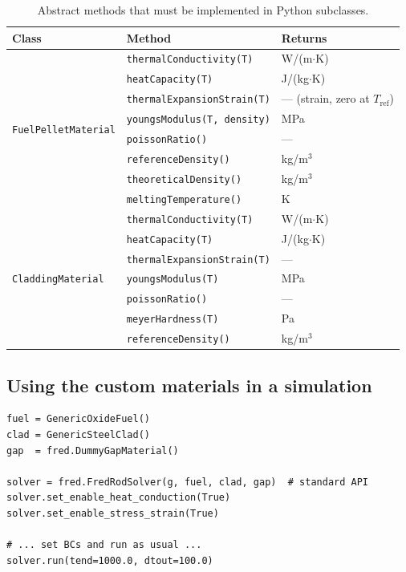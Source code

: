 \documentclass[11pt,a4paper]{article}
\begin{document}
\begin{table}[h]
\centering
\caption{Abstract methods that must be implemented in Python subclasses.}
\label{tab:abstract}
\begin{tabular}{lll}
\toprule
Class & Method & Returns \\
\midrule
\multirow{8}{*}{\texttt{FuelPelletMaterial}}
  & \texttt{thermalConductivity(T)}       & W/(m$\cdot$K) \\
  & \texttt{heatCapacity(T)}              & J/(kg$\cdot$K) \\
  & \texttt{thermalExpansionStrain(T)}    & --- (strain, zero at $T_\text{ref}$) \\
  & \texttt{youngsModulus(T, density)}    & MPa \\
  & \texttt{poissonRatio()}               & --- \\
  & \texttt{referenceDensity()}           & kg/m$^3$ \\
  & \texttt{theoreticalDensity()}         & kg/m$^3$ \\
  & \texttt{meltingTemperature()}         & K \\
\midrule
\multirow{7}{*}{\texttt{CladdingMaterial}}
  & \texttt{thermalConductivity(T)}       & W/(m$\cdot$K) \\
  & \texttt{heatCapacity(T)}             & J/(kg$\cdot$K) \\
  & \texttt{thermalExpansionStrain(T)}   & --- \\
  & \texttt{youngsModulus(T)}            & MPa \\
  & \texttt{poissonRatio()}              & --- \\
  & \texttt{meyerHardness(T)}           & Pa \\
  & \texttt{referenceDensity()}         & kg/m$^3$ \\
\bottomrule
\end{tabular}
\end{table}

\subsection{Using the custom materials in a simulation}

\begin{lstlisting}
fuel = GenericOxideFuel()
clad = GenericSteelClad()
gap  = fred.DummyGapMaterial()

solver = fred.FredRodSolver(g, fuel, clad, gap)  # standard API
solver.set_enable_heat_conduction(True)
solver.set_enable_stress_strain(True)

# ... set BCs and run as usual ...
solver.run(tend=1000.0, dtout=100.0)
\end{lstlisting}
\end{document}
